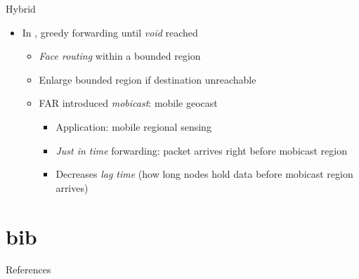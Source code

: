 \documentclass[pdftex]{beamer}
\begin{document}
\begin{frame}{Hybrid}
\begin{itemize}
	\item In \cite{Kuhn2003, Huang2005, Karp2000}, greedy forwarding until \emph{void} reached
	\begin{itemize}
		\item \emph{Face routing} within a bounded region
		\item Enlarge bounded region if destination unreachable
		\item FAR \cite{Huang2005} introduced \emph{mobicast}: mobile geocast
		\begin{itemize}
			\item Application: mobile regional sensing
			\item \emph{Just in time} forwarding: packet arrives right before mobicast region
			\item Decreases \emph{lag time} (how long nodes hold data before mobicast region arrives)
		\end{itemize}
	\end{itemize}
\end{itemize}
\end{frame}


\part{bib}

\begin{frame}{References}


\end{frame}
\end{document}
